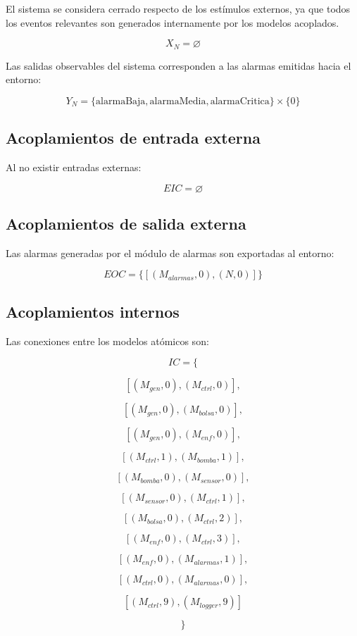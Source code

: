 \documentclass{article}
\begin{document}
El sistema se considera cerrado respecto de los estímulos externos, ya que todos los eventos relevantes son generados internamente por los modelos acoplados.

\[
X_N = \varnothing
\]

Las salidas observables del sistema corresponden a las alarmas emitidas hacia el entorno:

\[
Y_N =
\{
\mathrm{alarmaBaja},
\mathrm{alarmaMedia},
\mathrm{alarmaCritica}
\}
\times \{0\}
\]

\subsection{Acoplamientos de entrada externa}

Al no existir entradas externas:

\[
EIC = \varnothing
\]

\subsection{Acoplamientos de salida externa}

Las alarmas generadas por el módulo de alarmas son exportadas al entorno:

\[
EOC =
\{
[(M_{alarmas},0),(N,0)]
\}
\]

\subsection{Acoplamientos internos}

Las conexiones entre los modelos atómicos son:

\[
IC =
\{
\]

\[
[(M_{gen},0),(M_{ctrl},0)],
\]

\[
[(M_{gen},0),(M_{bolsa},0)],
\]

\[
[(M_{gen},0),(M_{enf},0)],
\]

\[
[(M_{ctrl},1),(M_{bomba},1)],
\]

\[
[(M_{bomba},0),(M_{sensor},0)],
\]

\[
[(M_{sensor},0),(M_{ctrl},1)],
\]

\[
[(M_{bolsa},0),(M_{ctrl},2)],
\]

\[
[(M_{enf},0),(M_{ctrl},3)],
\]

\[
[(M_{enf},0),(M_{alarmas},1)],
\]

\[
[(M_{ctrl},0),(M_{alarmas},0)],
\]

\[
[(M_{ctrl},9),(M_{logger},9)]
\]

\[
\}
\]
\end{document}
